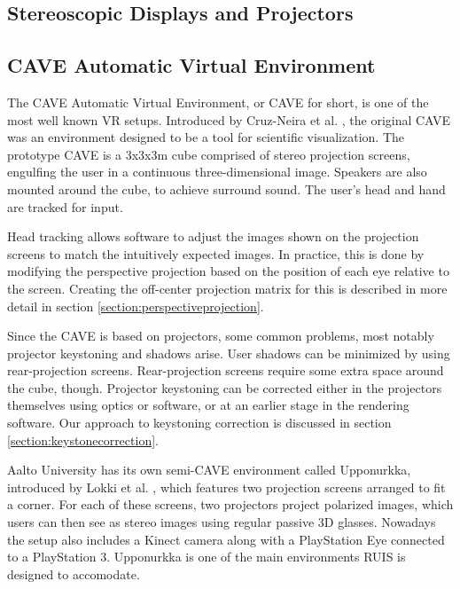 \documentclass[12pt,a4paper,oneside,pdftex]{report}
\begin{document}
\subsection{Stereoscopic Displays and Projectors}
\label{subsection:displayenvironments:stereoscopic}


\subsection{CAVE Automatic Virtual Environment}
\label{subsection:displayenvironments:cave}

The CAVE Automatic Virtual Environment, or CAVE for short, is one of the most well known VR setups. Introduced by Cruz-Neira et al. \cite{CAVE1, CAVE2}, the original CAVE was an environment designed to be a tool for scientific visualization. The prototype CAVE is a 3x3x3m cube comprised of stereo projection screens, engulfing the user in a continuous three-dimensional image. Speakers are also mounted around the cube, to achieve surround sound. The user's head and hand are tracked for input.

Head tracking allows software to adjust the images shown on the projection screens to match the intuitively expected images. In practice, this is done by modifying the perspective projection based on the position of each eye relative to the screen. Creating the off-center projection matrix for this is described in more detail in section \ref{section:perspectiveprojection}.

Since the CAVE is based on projectors, some common problems, most notably projector keystoning and shadows arise. User shadows can be minimized by using rear-projection screens. Rear-projection screens require some extra space around the cube, though. Projector keystoning can be corrected either in the projectors themselves using optics or software, or at an earlier stage in the rendering software. Our approach to keystoning correction is discussed in section \ref{section:keystonecorrection}.

Aalto University has its own semi-CAVE environment called Upponurkka, introduced by Lokki et al. \cite{Upponurkka}, which features two projection screens arranged to fit a corner. For each of these screens, two projectors project polarized images, which users can then see as stereo images using regular passive 3D glasses. Nowadays the setup also includes a Kinect camera along with a PlayStation Eye connected to a PlayStation 3. Upponurkka is one of the main environments RUIS is designed to accomodate. 
\end{document}
